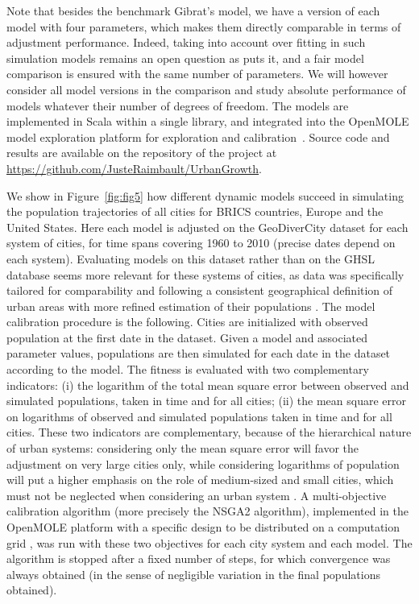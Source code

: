 \documentclass[11pt]{article}
\begin{document}
Note that besides the benchmark Gibrat’s model, we have a version of each model with four parameters, which makes them directly comparable in terms of adjustment performance. Indeed, taking into account over fitting in such simulation models remains an open question as \cite{raimbault2020indirect} puts it, and a fair model comparison is ensured with the same number of parameters. We will however consider all model versions in the comparison and study absolute performance of models whatever their number of degrees of freedom. The models are implemented in Scala within a single library, and integrated into the OpenMOLE model exploration platform for exploration and calibration~\cite{reuillon2013openmole}. Source code and results are available on the repository of the project at \url{https://github.com/JusteRaimbault/UrbanGrowth}.

We show in Figure~\ref{fig:fig5} how different dynamic models succeed in simulating the population trajectories of all cities for BRICS countries, Europe and the United States. Here each model is adjusted on the GeoDiverCity dataset for each system of cities, for time spans covering 1960 to 2010 (precise dates depend on each system). Evaluating models on this dataset rather than on the GHSL database seems more relevant for these systems of cities, as data was specifically tailored for comparability and following a consistent geographical definition of urban areas with more refined estimation of their populations \cite{pumain2015multilevel}. The model calibration procedure is the following. Cities are initialized with observed population at the first date in the dataset. Given a model and associated parameter values, populations are then simulated for each date in the dataset according to the model. The fitness is evaluated with two complementary indicators: (i) the logarithm of the total mean square error between observed and simulated populations, taken in time and for all cities; (ii) the mean square error on logarithms of observed and simulated populations taken in time and for all cities. These two indicators are complementary, because of the hierarchical nature of urban systems: considering only the mean square error will favor the adjustment on very large cities only, while considering logarithms of population will put a higher emphasis on the role of medium-sized and small cities, which must not be neglected when considering an urban system \cite{aveline2018pathways,denis2017subaltern}. A multi-objective calibration algorithm (more precisely the NSGA2 algorithm), implemented in the OpenMOLE platform with a specific design to be distributed on a computation grid \cite{schmitt2015half}, was run with these two objectives for each city system and each model. The algorithm is stopped after a fixed number of steps, for which convergence was always obtained (in the sense of negligible variation in the final populations obtained).
\end{document}
